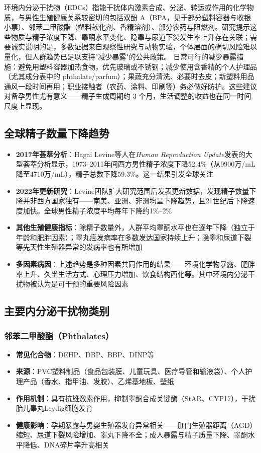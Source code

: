 \documentclass[12pt,a4paper,twoside]{ctexbook}
\begin{document}
环境内分泌干扰物（EDCs）指能干扰体内激素合成、分泌、转运或作用的化学物质，与男性生殖健康关系较密切的包括双酚 A（BPA，见于部分塑料容器与收银小票）、邻苯二甲酸酯（塑料软化剂、香精溶剂）、部分农药与阻燃剂。研究提示这些物质与精子浓度下降、睾酮水平变化、隐睾与尿道下裂发生率上升存在关联；需要诚实说明的是，多数证据来自观察性研究与动物实验，个体层面的确切风险难以量化，但人群趋势已足以支持"减少暴露"的公共政策。
日常可行的减少暴露措施：避免用塑料容器加热食物，优先玻璃或不锈钢；减少使用含香精的个人护理品（尤其成分表中的 phthalate/parfum）；果蔬充分清洗、必要时去皮；新塑料用品通风一段时间再用；职业接触者（农药、涂料、印刷等）务必做好防护。这些建议对备孕男性尤有意义——精子生成周期约 3 个月，生活调整的收益也在同一时间尺度上显现。

\subsection{全球精子数量下降趋势}

\begin{itemize}[leftmargin=2cm]
	\item \textbf{2017年荟萃分析}：Hagai Levine等人在\textit{Human Reproduction Update}发表的大型荟萃分析显示，1973--2011年间西方男性精子浓度下降52.4\%（从9900万/mL降至4710万/mL），精子总数下降59.3\%。这一结果引发全球关注
	\item \textbf{2022年更新研究}：Levine团队扩大研究范围后发表更新数据，发现精子数量下降并非西方国家独有——南美、亚洲、非洲均呈下降趋势，且21世纪后下降速度加快。全球男性精子浓度平均每年下降约1\%--2\%
	\item \textbf{其他生殖健康指标}：除精子数量外，人群平均睾酮水平也在逐年下降（独立于年龄和肥胖因素）；睾丸癌发病率在多数发达国家持续上升；隐睾和尿道下裂等先天性生殖器异常的发病率也有所增加
	\item \textbf{多因素病因}：上述趋势是多种因素共同作用的结果——环境化学物暴露、肥胖率上升、久坐生活方式、心理压力增加、饮食结构西化等。其中环境内分泌干扰物被认为是可干预的重要风险因素
\end{itemize}

\subsection{主要内分泌干扰物类别}

\subsubsection{邻苯二甲酸酯（Phthalates）}

\begin{itemize}[leftmargin=2cm]
	\item \textbf{常见化合物}：DEHP、DBP、BBP、DINP等
	\item \textbf{来源}：PVC塑料制品（食品包装膜、儿童玩具、医疗导管和输液袋）、个人护理产品（香水、指甲油、发胶）、乙烯基地板、壁纸
	\item \textbf{作用机制}：具有抗雄激素作用，抑制睾酮合成关键酶（StAR、CYP17），干扰胎儿睾丸Leydig细胞发育
	\item \textbf{健康影响}：孕期暴露与男婴生殖器发育异常相关——肛门生殖器距离（AGD）缩短、尿道下裂风险增加、睾丸下降不全；成人暴露与精子质量下降、睾酮水平降低、DNA碎片率升高相关
\end{itemize}
\end{document}
